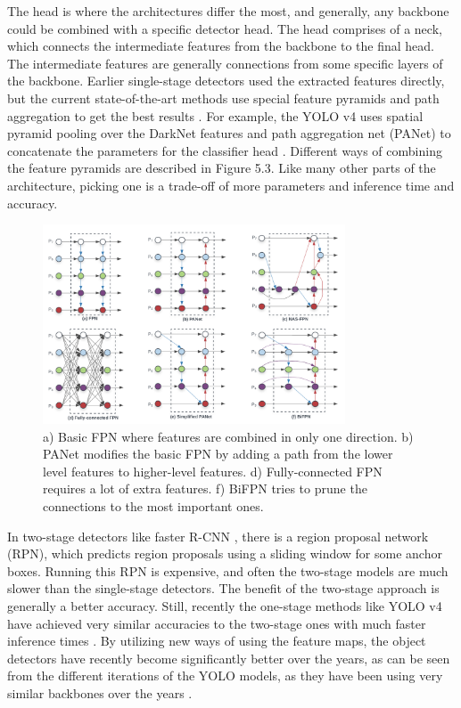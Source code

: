 The head is where the architectures differ the most, and generally, any backbone could be combined with a specific detector head.
The head comprises of a neck, which connects the intermediate features from the backbone to the final head.
The intermediate features are generally connections from some specific layers of the backbone.
Earlier single-stage detectors used the extracted features directly, but the current state-of-the-art methods use special feature pyramids and path aggregation to get the best results \citep{efficientDet}.
For example, the YOLO v4 uses spatial pyramid pooling \citep{SPP} over the DarkNet features and path aggregation net (PANet) \citep{PANET} to concatenate the parameters for the classifier head \citep{yolov4}.
Different ways of combining the feature pyramids are described in Figure 5.3.
Like many other parts of the architecture, picking one is a trade-off of more parameters and inference time and accuracy.
\begin{figure}[h!]
    \centering
    \includegraphics[width=0.8\textwidth]{imgs/detector_necks.png}
    \caption{a) Basic FPN \citep{FPN} where features are combined in only one direction. b) PANet modifies the basic FPN by adding a path from the lower level features to higher-level features. d) Fully-connected FPN requires a lot of extra features. f) BiFPN tries to prune the connections to the most important ones.}
\end{figure}

In two-stage detectors like faster R-CNN \citep{faster-rcnn}, there is a region proposal network (RPN), which predicts region proposals using a sliding window for some anchor boxes.
Running this RPN is expensive, and often the two-stage models are much slower than the single-stage detectors.
The benefit of the two-stage approach is generally a better accuracy. 
Still, recently the one-stage methods like YOLO v4 have achieved very similar accuracies to the two-stage ones with much faster inference times \citep{yolov4}.
By utilizing new ways of using the feature maps, the object detectors have recently become significantly better over the years, as can be seen from the different iterations of the YOLO models, as they have been using very similar backbones over the years \citep{yolov4}.

